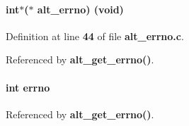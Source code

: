 \paragraph[{alt\+\_\+errno}]{\setlength{\rightskip}{0pt plus 5cm}int$\ast$($\ast$ alt\+\_\+errno) (void)}\label{alt__errno_8h_a036c78b27dedbe6d6bd965da414411ac}


Definition at line {\bf 44} of file {\bf alt\+\_\+errno.\+c}.



Referenced by {\bf alt\+\_\+get\+\_\+errno()}.

\paragraph[{errno}]{\setlength{\rightskip}{0pt plus 5cm}int errno}\label{alt__errno_8h_ad65a8842cc674e3ddf69355898c0ecbf}


Referenced by {\bf alt\+\_\+get\+\_\+errno()}.

